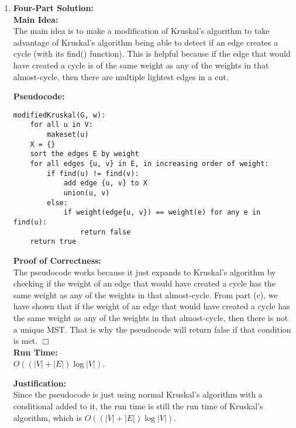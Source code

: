 \documentclass[11pt]{article}
\def\endproofmark{$\Box$}
\newenvironment{FourPartSolution}{\par{\bf Four-Part Solution:}}{\smallskip}
\newenvironment{mainIdea}{{\bf Main Idea:}}{\smallskip}
\newenvironment{pseudocode}{\par{\bf Pseudocode:}}{\smallskip}
\newenvironment{proofOfCorrectness}{\par{\bf Proof of Correctness:}}{\endproofmark\smallskip}
\newenvironment{runTime}{{\bf Run Time:}}{\smallskip}
\newenvironment{justification}{\par{\bf Justification:}}{\smallskip}
\begin{document}
\begin{enumerate}[label=(\alph*)]
\item
\begin{FourPartSolution}
\\
\begin{mainIdea}
\\
The main idea is to make a modification of Kruskal's algorithm to take advantage of Kruskal's algorithm being able to detect if an edge creates a cycle (with its find() function). This is helpful because if the edge that would have created a cycle is of the same weight as any of the weights in that almost-cycle, then there are multiple lightest edges in a cut.
\end{mainIdea}
\\
\begin{pseudocode}
\begin{lstlisting}
modifiedKruskal(G, w):
	for all u in V:
		makeset(u)
	X = {}
	sort the edges E by weight
	for all edges {u, v} in E, in increasing order of weight:
		if find(u) != find(v):
			add edge {u, v} to X
			union(u, v)
		else:
			if weight(edge{u, v}) == weight(e) for any e in find(u):
				return false
	return true
\end{lstlisting}
\end{pseudocode}
\begin{proofOfCorrectness}
\\
The pseudocode works because it just expands to Kruskal's algorithm by checking if the weight of an edge that would have created a cycle has the same weight as any of the weights in that almost-cycle. From part (c), we have shown that if the weight of an edge that would have created a cycle has the same weight as any of the weights in that almost-cycle, then there is not a unique MST. That is why the pseudocode will return false if that condition is met.
\end{proofOfCorrectness}
\\
\begin{runTime}
\\
$O((|V| + |E|) \log{|V|})$.
\end{runTime}
\\
\begin{justification}
\\
Since the pseudocode is just using normal Kruskal's algorithm with a conditional added to it, the run time is still the run time of Kruskal's algorithm, which is $O((|V| + |E|) \log{|V|})$.
\end{justification}
\end{FourPartSolution}
\end{enumerate}
\end{document}
